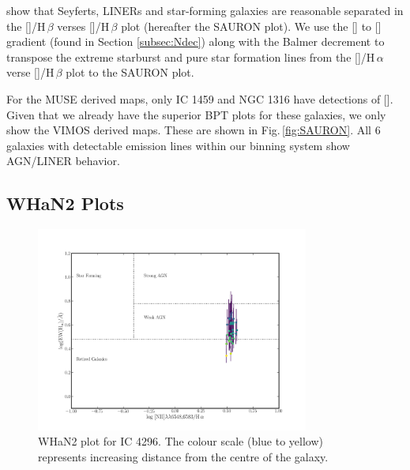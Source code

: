 		\citet{Sarzi2010} show that Seyferts, LINERs and star-forming galaxies are reasonable separated in the []/H\,$\beta$ verses []/H\,$\beta$ plot (hereafter the SAURON plot). We use the [] to [] gradient (found in Section \ref{subsec:Ndec}) along with the Balmer decrement to transpose the \citet{Kewley2001} extreme starburst and \citet{Kauffmann2003a} pure star formation lines from the []/H\,$\alpha$ verse []/H\,$\beta$ plot to the SAURON plot.

		For the MUSE derived maps, only IC 1459 and NGC 1316 have detections of []. Given that we already have the superior BPT plots for these galaxies, we only show the VIMOS derived maps. These are shown in Fig.\,\ref{fig:SAURON}. All 6 galaxies with detectable emission lines within our binning system show AGN/LINER behavior.

		


	\subsection{WHaN2 Plots}
		\label{subsec:WHaN2}
		\begin{figure}
			\centering
			\includegraphics[width=0.8\textwidth]{chapter5/WHaN2.png}
			\caption[WHaN2 plot for IC 4296]{WHaN2 plot for IC 4296. The colour scale (blue to yellow) represents increasing distance from the centre of the galaxy.}
			\label{fig:WHaN2}
		\end{figure}

